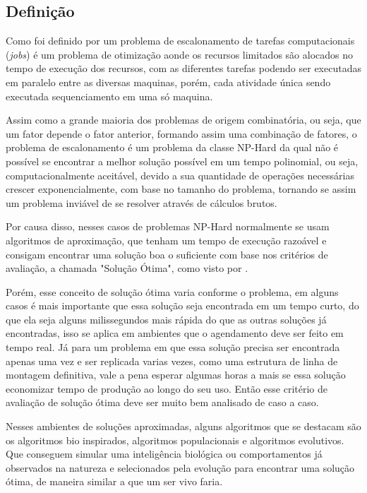     \subsection{Definição}
        Como foi definido por \cite{Bagchi1999} um problema de escalonamento de tarefas computacionais (\textit{jobs}) é um problema de otimização aonde os recursos limitados são alocados no tempo de execução dos recursos, com as diferentes tarefas podendo ser executadas em paralelo entre as diversas maquinas, porém, cada atividade única sendo executada sequenciamento em uma só maquina.\newline

        Assim como a grande maioria dos problemas de origem combinatória, ou seja, que um fator depende o fator anterior, formando assim uma combinação de fatores, o problema de escalonamento é um problema da classe NP-Hard da qual não é possível se encontrar a melhor solução possível em um tempo polinomial, ou seja, computacionalmente aceitável, devido a sua quantidade de operações necessárias crescer exponencialmente, com base no tamanho do problema, tornando se assim um problema inviável de se resolver através de cálculos brutos.\newline

        Por causa disso, nesses casos de problemas NP-Hard normalmente se usam algoritmos de aproximação, que tenham um tempo de execução razoável e consigam encontrar uma solução boa o suficiente com base nos critérios de avaliação, a chamada "Solução Ótima", como visto por \cite{lawler1993}.\newline

        Porém, esse conceito de solução ótima varia conforme o problema, em alguns casos é mais importante que essa solução seja encontrada em um tempo curto, do que ela seja alguns milissegundos mais rápida do que as outras soluções já encontradas, isso se aplica em ambientes que o agendamento deve ser feito em tempo real.\newline
        Já para um problema em que essa solução precisa ser encontrada apenas uma vez e ser replicada varias vezes, como uma estrutura de linha de montagem definitiva, vale a pena esperar algumas horas a mais se essa solução economizar tempo de produção ao longo do seu uso. Então esse critério de avaliação de solução ótima deve ser muito bem analisado de caso a caso. \newline

        Nesses ambientes de soluções aproximadas, alguns algoritmos que se destacam são os algoritmos bio inspirados, algoritmos populacionais e algoritmos evolutivos. Que conseguem simular uma inteligência biológica ou comportamentos já observados na natureza e selecionados pela evolução para encontrar uma solução ótima, de maneira similar a que um ser vivo faria.


